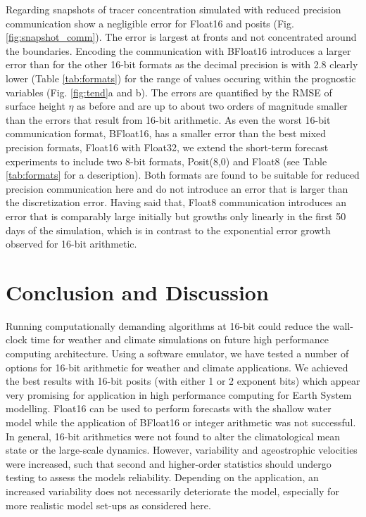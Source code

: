 \documentclass[draft]{agujournal2019}
\begin{document}
Regarding snapshots of tracer concentration simulated with reduced precision communication show a negligible error for Float16 and posits (Fig. \ref{fig:snapshot_comm}). The error is largest at fronts and not concentrated around the boundaries. Encoding the communication with BFloat16 introduces a larger error than for the other 16-bit formats as the decimal precision is with 2.8 clearly lower (Table \ref{tab:formats}) for the range of values occuring within the prognostic variables (Fig. \ref{fig:tend}a and b). The errors are quantified by the RMSE of surface height $\eta$ as before and are up to about two orders of magnitude smaller than the errors that result from 16-bit arithmetic. As even the worst 16-bit communication format, BFloat16, has a smaller error than the best mixed precision formats, Float16 with Float32, we extend the short-term forecast experiments to include two 8-bit formats, Posit(8,0) and Float8 (see Table \ref{tab:formats} for a description). Both formats are found to be suitable for reduced precision communication here and do not introduce an error that is larger than the discretization error. Having said that, Float8 communication introduces an error that is comparably large initially but growths only linearly in the first 50 days of the simulation, which is in contrast to the exponential error growth observed for 16-bit arithmetic.


\section{Conclusion and Discussion}
\label{sec:discuss}

Running computationally demanding algorithms at 16-bit could reduce the wall-clock time for weather and climate simulations on future high performance computing architecture.
Using a software emulator, we have tested a number of options for 16-bit arithmetic for weather and climate applications.
We achieved the best results with 16-bit posits (with either 1 or 2 exponent bits) which appear very promising for application in high performance computing for Earth System modelling.
Float16 can be used to perform forecasts with the shallow water model while the application of BFloat16 or integer arithmetic was not successful.
In general, 16-bit arithmetics were not found to alter the climatological mean state or the large-scale dynamics.
However, variability and ageostrophic velocities were increased, such that second and higher-order statistics should undergo testing to assess the models reliability.
Depending on the application, an increased variability does not necessarily deteriorate the model, especially for more realistic model set-ups as considered here.
\end{document}

